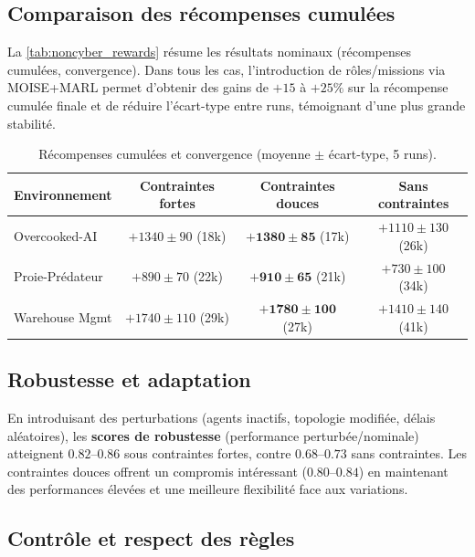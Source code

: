 \subsection*{Comparaison des récompenses cumulées}

La \autoref{tab:noncyber_rewards} résume les résultats nominaux (récompenses cumulées, convergence).
Dans tous les cas, l’introduction de rôles/missions via MOISE+MARL permet d’obtenir des gains de $+15$ à $+25\%$ sur la récompense cumulée finale et de réduire l’écart-type entre runs, témoignant d’une plus grande stabilité.

\begin{table}[h!]
  \centering
  \caption{Récompenses cumulées et convergence (moyenne $\pm$ écart-type, 5 runs).}
  \label{tab:noncyber_rewards}
  \renewcommand{\arraystretch}{1.2}
  \small
  \begin{tabular}{|l|c|c|c|}
    \hline
    \textbf{Environnement} & \textbf{Contraintes fortes} & \textbf{Contraintes douces}    & \textbf{Sans contraintes} \\
    \hline
    Overcooked-AI          & $+1340 \pm 90$ (18k)        & $\mathbf{+1380 \pm 85}$ (17k)  & $+1110 \pm 130$ (26k)     \\
    Proie-Prédateur        & $+890 \pm 70$ (22k)         & $\mathbf{+910 \pm 65}$ (21k)   & $+730 \pm 100$ (34k)      \\
    Warehouse Mgmt         & $+1740 \pm 110$ (29k)       & $\mathbf{+1780 \pm 100}$ (27k) & $+1410 \pm 140$ (41k)     \\
    \hline
  \end{tabular}
\end{table}

\subsection*{Robustesse et adaptation}

En introduisant des perturbations (agents inactifs, topologie modifiée, délais aléatoires), les \textbf{scores de robustesse} (performance perturbée/nominale) atteignent $0.82$–$0.86$ sous contraintes fortes, contre $0.68$–$0.73$ sans contraintes.
Les contraintes douces offrent un compromis intéressant ($0.80$–$0.84$) en maintenant des performances élevées et une meilleure flexibilité face aux variations.

\subsection*{Contrôle et respect des règles}

